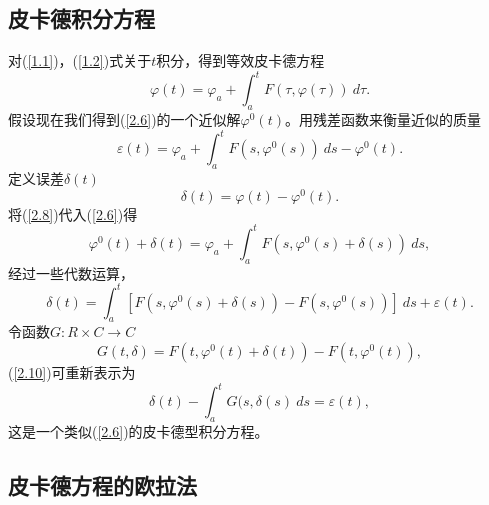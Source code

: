 \documentclass[12pt,a4paper]{article}
\begin{document}
\subsection{皮卡德积分方程}
对(\ref{1.1})，(\ref{1.2})式关于$t$积分，得到等效皮卡德方程\\
\begin{equation}
\label{2.6}
\varphi(t)=\varphi_a + \int _{a}^{t} F(\tau,\varphi(\tau))~d\tau.
\end{equation}
假设现在我们得到(\ref{2.6})的一个近似解$\varphi^0(t)$。用残差函数来衡量近似的质量\\
\begin{equation}
\label{2.7}
\varepsilon(t)=\varphi_a + \int_{a}^{t} F(s,\varphi^0(s))~ds-\varphi^0(t).
\end{equation}
定义误差$\delta(t)$\\
\begin{equation}
\label{2.8}
\delta(t)=\varphi(t)-\varphi^0(t).
\end{equation}
将(\ref{2.8})代入(\ref{2.6})得\\
\begin{equation}
\varphi ^0(t)+\delta(t)=\varphi_a+\int _{a}^{t}F(s,\varphi^0(s)+\delta(s))~ds,
\end{equation}
经过一些代数运算，\\
\begin{equation}
\label{2.10}
\delta(t)=\int _{a}^{t}[F(s,\varphi^0(s)+\delta(s))-F(s,\varphi^0(s))]~ds+\varepsilon(t).
\end{equation}
令函数$G:R \times C \rightarrow C$\\
\begin{equation}
\label{2.11}
G(t,\delta)= F(t,\varphi^0(t)+\delta(t))-F(t,\varphi^0(t)),
\end{equation}
(\ref{2.10})可重新表示为\\
\begin{equation}
\label{2.12}
\delta(t)- \int_{a}^{t}G(s,\delta(s)~ds=\varepsilon(t),
\end{equation}
这是一个类似(\ref{2.6})的皮卡德型积分方程。\\
\subsection{皮卡德方程的欧拉法}
\end{document}
